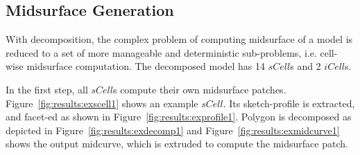 \subsection{Midsurface Generation}

With decomposition, the complex problem of computing midsurface of a model is reduced to a set of more manageable and deterministic sub-problems, i.e. cell-wise midsurface computation. The decomposed model has 14 $sCell$s and 2 $iCell$s.

In the first step, all $sCell$s compute their own midsurface patches. Figure~\ref{fig:results:exscell1} shows an example $sCell$. Its sketch-profile is extracted, and facet-ed as shown in Figure~\ref{fig:results:exprofile1}. Polygon is decomposed as depicted in Figure~\ref{fig:results:exdecomp1} and  Figure~\ref{fig:results:exmidcurve1} shows the output midcurve, which is extruded to compute the midsurface patch.





